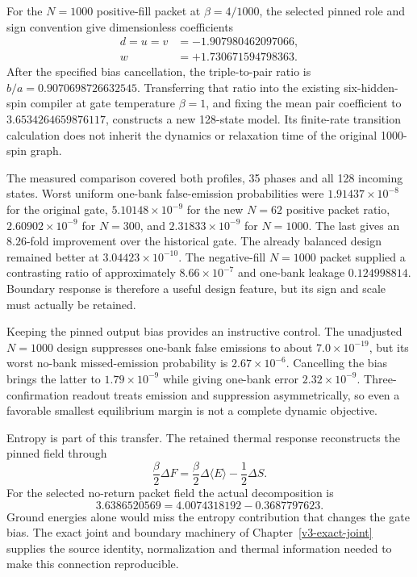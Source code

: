 For the $N=1000$ positive-fill packet at $\beta=4/1000$, the selected pinned role and sign convention give dimensionless coefficients
\begin{align*}
 d=u=v&=-1.907980462097066,\\
 w&=+1.730671594798363.
\end{align*}
After the specified bias cancellation, the triple-to-pair ratio is $b/a=0.9070698726632545$. Transferring that ratio into the existing six-hidden-spin compiler at gate temperature $\beta=1$, and fixing the mean pair coefficient to $3.6534264659876117$, constructs a new 128-state model. Its finite-rate transition calculation does not inherit the dynamics or relaxation time of the original 1000-spin graph.

The measured comparison covered both profiles, 35 phases and all 128 incoming states. Worst uniform one-bank false-emission probabilities were $1.91437\times10^{-8}$ for the original gate, $5.10148\times10^{-9}$ for the new $N=62$ positive packet ratio, $2.60902\times10^{-9}$ for $N=300$, and $2.31833\times10^{-9}$ for $N=1000$. The last gives an $8.26$-fold improvement over the historical gate. The already balanced design remained better at $3.04423\times10^{-10}$. The negative-fill $N=1000$ packet supplied a contrasting ratio of approximately $8.66\times10^{-7}$ and one-bank leakage $0.124998814$. Boundary response is therefore a useful design feature, but its sign and scale must actually be retained.

Keeping the pinned output bias provides an instructive control. The unadjusted $N=1000$ design suppresses one-bank false emissions to about $7.0\times10^{-19}$, but its worst no-bank missed-emission probability is $2.67\times10^{-6}$. Cancelling the bias brings the latter to $1.79\times10^{-9}$ while giving one-bank error $2.32\times10^{-9}$. Three-confirmation readout treats emission and suppression asymmetrically, so even a favorable smallest equilibrium margin is not a complete dynamic objective.

Entropy is part of this transfer. The retained thermal response reconstructs the pinned field through
\[
 \frac{\beta}{2}\Delta F
 =\frac{\beta}{2}\Delta\langle E\rangle-\frac12\Delta S.
\]
For the selected no-return packet field the actual decomposition is
\[
 3.6386520569=4.0074318192-0.3687797623.
\]
Ground energies alone would miss the entropy contribution that changes the gate bias. The exact joint and boundary machinery of Chapter~\ref{v3-exact-joint} supplies the source identity, normalization and thermal information needed to make this connection reproducible.


